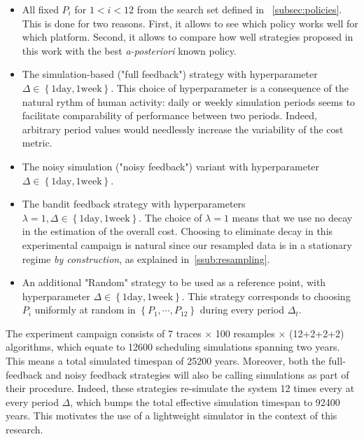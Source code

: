 \documentclass[sigconf,review,anonymous]{acmart}
\begin{document}
\begin{itemize}

  \item All fixed $P_i$ for $1<i<12$ from the search set defined in
    ~\ref{subsec:policies}.  This is done for two reasons. First, it allows to
    see which policy works well for which platform. Second, it allows to
    compare how well strategies proposed in this work with the best
    \textit{a-posteriori} known policy.

  \item The simulation-based ("full feedback") strategy with hyperparameter
    $\Delta \in \left\{ 1 \text{day},1 \text{week} \right\}$. This choice of
    hyperparameter is a consequence of the natural rythm of human activity:
    daily or weekly simulation periods seems to facilitate comparability of
    performance between two periods. Indeed, arbitrary period values would
    needlessly increase the variability of the cost metric.

  \item The noisy simulation ("noisy feedback") variant with hyperparameter
    $\Delta \in \left\{ 1 \text{day},1 \text{week} \right\}$.

  \item The bandit feedback strategy with hyperparameters $\lambda=1, \Delta
    \in \left\{ 1 \text{day},1 \text{week} \right\}$. The choice of $\lambda=1$
    means that we use no decay in the estimation of the overall cost. Choosing
    to eliminate decay in this experimental campaign is natural since our
    resampled data is in a stationary regime \textit{by construction}, as
    explained in~\ref{ssub:resampling}.

  \item An additional "Random" strategy to be used as a reference point, with
    hyperparameter $ \Delta \in \left\{ 1 \text{day},1 \text{week} \right\}$.
    This strategy corresponds to choosing $P_i$ uniformly at random in $\left\{
      P_1 , \cdots, P_{12} \right\}$ during every period $\Delta_t$.

\end{itemize}

The experiment campaign consists of 7 traces $\times$ 100 resamples $\times$
(12+2+2+2) algorithms, which equate to 12600 scheduling simulations spanning
two years.  This means a total simulated timespan of 25200 years. Moreover,
both the full-feedback and noisy feedback strategies will also be calling
simulations as part of their procedure. Indeed, these strategies re-simulate
the system 12 times every at every period $\Delta$, which bumps the total
effective simulation timespan to 92400 years. This motivates the use of a
lightweight simulator in the context of this research.
\end{document}
